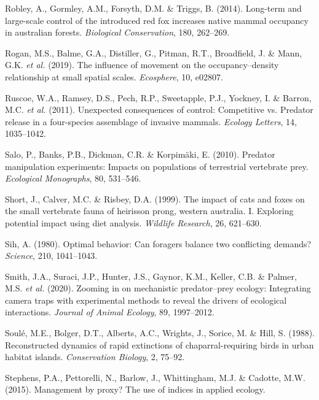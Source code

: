 \documentclass[]{elsarticle} %
\begin{document}
\leavevmode\hypertarget{ref-robley2014}{}%
Robley, A., Gormley, A.M., Forsyth, D.M. \& Triggs, B. (2014). Long-term and large-scale control of the introduced red fox increases native mammal occupancy in australian forests. \emph{Biological Conservation}, 180, 262--269.

\leavevmode\hypertarget{ref-rogan2019}{}%
Rogan, M.S., Balme, G.A., Distiller, G., Pitman, R.T., Broadfield, J. \& Mann, G.K. \emph{et al.} (2019). The influence of movement on the occupancy--density relationship at small spatial scales. \emph{Ecosphere}, 10, e02807.

\leavevmode\hypertarget{ref-ruscoe2011}{}%
Ruscoe, W.A., Ramsey, D.S., Pech, R.P., Sweetapple, P.J., Yockney, I. \& Barron, M.C. \emph{et al.} (2011). Unexpected consequences of control: Competitive vs. Predator release in a four-species assemblage of invasive mammals. \emph{Ecology Letters}, 14, 1035--1042.

\leavevmode\hypertarget{ref-https:ux2fux2fdoi.orgux2f10.1890ux2f09-1260.1}{}%
Salo, P., Banks, P.B., Dickman, C.R. \& Korpimäki, E. (2010). Predator manipulation experiments: Impacts on populations of terrestrial vertebrate prey. \emph{Ecological Monographs}, 80, 531--546.

\leavevmode\hypertarget{ref-short1999}{}%
Short, J., Calver, M.C. \& Risbey, D.A. (1999). The impact of cats and foxes on the small vertebrate fauna of heirisson prong, western australia. I. Exploring potential impact using diet analysis. \emph{Wildlife Research}, 26, 621--630.

\leavevmode\hypertarget{ref-SIH1041}{}%
Sih, A. (1980). Optimal behavior: Can foragers balance two conflicting demands? \emph{Science}, 210, 1041--1043.

\leavevmode\hypertarget{ref-smith2020}{}%
Smith, J.A., Suraci, J.P., Hunter, J.S., Gaynor, K.M., Keller, C.B. \& Palmer, M.S. \emph{et al.} (2020). Zooming in on mechanistic predator--prey ecology: Integrating camera traps with experimental methods to reveal the drivers of ecological interactions. \emph{Journal of Animal Ecology}, 89, 1997--2012.

\leavevmode\hypertarget{ref-soule1988}{}%
Soulé, M.E., Bolger, D.T., Alberts, A.C., Wrights, J., Sorice, M. \& Hill, S. (1988). Reconstructed dynamics of rapid extinctions of chaparral-requiring birds in urban habitat islands. \emph{Conservation Biology}, 2, 75--92.

\leavevmode\hypertarget{ref-stephens2015}{}%
Stephens, P.A., Pettorelli, N., Barlow, J., Whittingham, M.J. \& Cadotte, M.W. (2015). Management by proxy? The use of indices in applied ecology.
\end{document}
